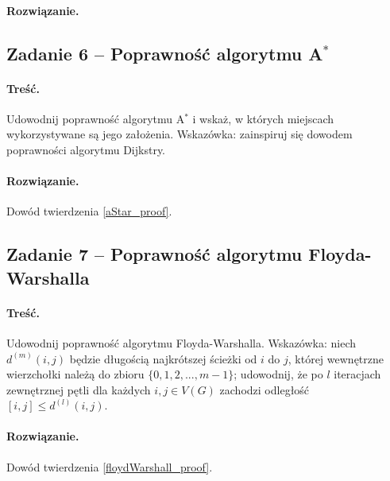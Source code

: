 \paragraph{Rozwiązanie.}%

\subsection{Zadanie 6 -- Poprawność algorytmu A\texorpdfstring{$^*$}{TEXT}}
\paragraph{Treść.}Udowodnij poprawność algorytmu 
A$^*$ i wskaż, w których miejscach wykorzystywane są jego założenia.
Wskazówka: zainspiruj się dowodem poprawności algorytmu Dijkstry.

\paragraph{Rozwiązanie.}Dowód twierdzenia \ref{aStar_proof}.

\subsection{Zadanie 7 -- Poprawność algorytmu Floyda-Warshalla}
\paragraph{Treść.}Udowodnij poprawność algorytmu Floyda-Warshalla. 
Wskazówka: niech 
$d^{(m)}(i, j)$ będzie długością
najkrótszej ścieżki od $i$ do $j$, której wewnętrzne wierzchołki należą
do zbioru $\{0, 1, 2, . . . , m - 1\}$; 
udowodnij, że po $l$
iteracjach zewnętrznej pętli dla każdych $i, j \in V (G)$ zachodzi 
odległość$[i, j] \leq d^{(l)}(i, j)$.

\paragraph{Rozwiązanie.}Dowód twierdzenia \ref{floydWarshall_proof}.
